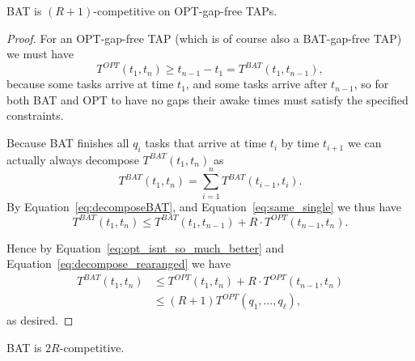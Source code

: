 \begin{proposition}
  \label{prop:no_optgaps}
  BAT is $(R+1)$-competitive on OPT-gap-free TAPs.
\end{proposition}
\begin{proof}
  For an OPT-gap-free TAP (which is of course also a BAT-gap-free
  TAP) we must have
  \begin{equation}
    \label{eq:opt_isnt_so_much_better}
    T^{OPT}(t_1, t_n) \ge t_{n-1} - t_1 = T^{BAT}(t_1, t_{n-1}),
  \end{equation}
  because some tasks arrive at time $t_1$, and some tasks arrive
  after $t_{n-1}$, so for both BAT and OPT to have no gaps their
  awake times must satisfy the specified constraints.

  Because BAT finishes all $q_{i}$ tasks that arrive at time $t_i$
  by time $t_{i+1}$ we can actually always decompose
  $T^{BAT}(t_1, t_n)$ as 
  \begin{equation}
    \label{eq:decomposeBAT}
    T^{BAT}(t_1, t_n) = \sum_{i=1}^n T^{BAT}(t_{i-1}, t_i).
  \end{equation}
  By Equation~\eqref{eq:decomposeBAT}, and
  Equation~\eqref{eq:same_single} we thus have 
  \begin{equation}
    \label{eq:decompose_rearanged}
    T^{BAT}(t_1, t_n) \le T^{BAT}(t_1, t_{n-1}) + R \cdot T^{OPT}(t_{n-1}, t_n).
  \end{equation}

  Hence by Equation~\eqref{eq:opt_isnt_so_much_better} and
  Equation~\eqref{eq:decompose_rearanged} we have
  \begin{align*}
    T^{BAT}(t_1, t_n) &\le T^{OPT}(t_1, t_n) + R\cdot T^{OPT}(t_{n-1}, t_n)\\
                                 &\le (R+1)T^{OPT}(q_1, \ldots, q_\ell),
  \end{align*}
  as desired.
\end{proof}

\begin{theorem}
  \label{thm:constant_competitive}
  BAT is $2R$-competitive.
\end{theorem}

